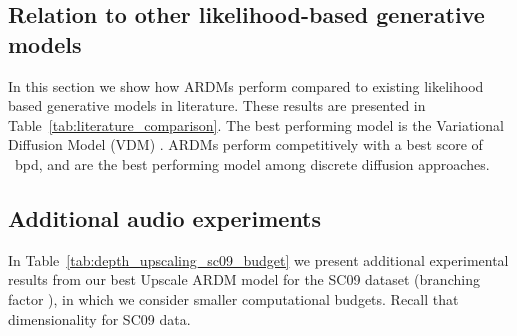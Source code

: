 \documentclass{article} \usepackage{iclr2022_conference,times}
\begin{document}
\subsection{Relation to other likelihood-based generative models}

In this section we show how ARDMs perform compared to existing likelihood based generative models in literature. These results are presented in Table~\ref{tab:literature_comparison}. The best performing model is the Variational Diffusion Model (VDM) \citep{kingma2021vdm}. ARDMs perform competitively with a best score of ~bpd, and are the best performing model among discrete diffusion approaches.
\begin{table}[h!]
\vspace{-.2cm}
    \centering
    \caption{CIFAR-10 generative modelling.}
    \label{tab:literature_comparison}
\end{table}


\subsection{Additional audio experiments}
In Table~\ref{tab:depth_upscaling_sc09_budget} we present additional experimental results from our best Upscale ARDM model for the SC09 dataset (branching factor ), in which we consider smaller computational budgets. Recall that dimensionality  for SC09 data.
\end{document}
